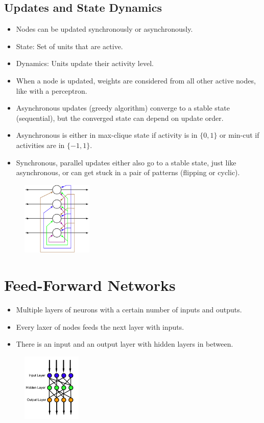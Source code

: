 \documentclass[a4paper, 12pt]{article}
\begin{document}
\subsection{Updates and State Dynamics}
\begin{itemize}[noitemsep,nolistsep]
	\item Nodes can be updated synchronously or asynchronously.
	\item State: Set of units that are active.
	\item Dynamics: Units update their activity level.
	\item When a node is updated, weights are considered from all other active nodes, like with a perceptron.
	\item Asynchronous updates (greedy algorithm) converge to a stable state (sequential), but the converged state can depend on update order.
	\item Asynchronous is either in max-clique state if activity is in $\{0,1\}$ or min-cut if activities are in $\{-1,1\}$.
	\item Synchronous, parallel updates either also go to a stable state, just like asynchronous, or can get stuck in a pair of patterns (flipping or cyclic).
\end{itemize}
\begin{figure}[H]
	\centering
	\includegraphics[width=0.3\textwidth]{hopfield-network.png}
\end{figure}

\section{Feed-Forward Networks}
\begin{itemize}[noitemsep,nolistsep]
	\item Multiple layers of neurons with a certain number of inputs and outputs.
	\item Every laxer of nodes feeds the next layer with inputs.
	\item There is an input and an output layer with hidden layers in between.
\end{itemize}
\begin{figure}[H]
	\includegraphics[width=0.25\textwidth]{Feed_forward_neural_net.png}
\end{figure}
\end{document}
